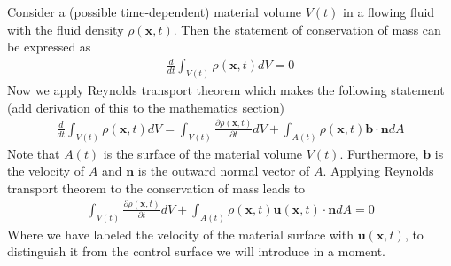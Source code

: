 \documentclass[a4paper, 12pt]{article}
\numberwithin{equation}{subsubsection}
\begin{document}
Consider a (possible time-dependent) material volume $V(t)$ in a flowing fluid with the fluid density $\rho(\mathbf{x}, t)$. Then the statement of conservation of mass can be expressed as
\begin{align}
	\frac{d}{dt} \int_{V(t)} \rho(\mathbf{x}, t) dV = 0 \label{eq:N2_NS_volume_mass_conservation}
\end{align}
Now we apply Reynolds transport theorem which makes the following statement (add derivation of this to the mathematics section)
\begin{align}
	\frac{d}{dt} \int_{V(t)} \rho(\mathbf{x}, t) dV = \int_{V(t)} \frac{\partial \rho(\mathbf{x}, t)}{\partial t} d V + \int_{A(t)} \rho(\mathbf{x}, t) \mathbf{b} \cdot \mathbf{n} dA \label{eq:N2_NS_reynolds_transport_theorem}
\end{align}
Note that $A(t)$ is the surface of the material volume $V(t)$. Furthermore, $\mathbf{b}$ is the velocity of $A$ and $\mathbf{n}$ is the outward normal vector of $A$. Applying Reynolds transport theorem to the conservation of mass leads to
\begin{align}
	\int_{V(t)} \frac{\partial \rho(\mathbf{x}, t)}{\partial t} d V + \int_{A(t)} \rho(\mathbf{x}, t) \mathbf{u}(\mathbf{x}, t) \cdot \mathbf{n} dA = 0 \label{eq:N2_NS_reynolds_on_mass_conservation}
\end{align}
Where we have labeled the velocity of the material surface with $\mathbf{u}(\mathbf{x}, t)$, to distinguish it from the control surface we will introduce in a moment.
\end{document}
